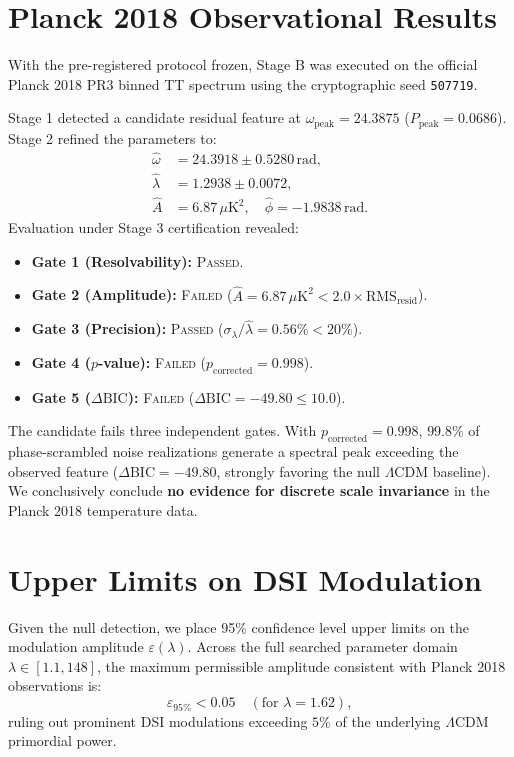 \documentclass[10pt,twocolumn,a4paper]{article}
\begin{document}
\section{Planck 2018 Observational Results}
With the pre-registered protocol frozen, Stage B was executed on the official Planck 2018 PR3 binned TT spectrum using the cryptographic seed \texttt{507719}.

Stage 1 detected a candidate residual feature at $\omega_{\mathrm{peak}} = 24.3875$ ($P_{\mathrm{peak}} = 0.0686$). Stage 2 refined the parameters to:
\begin{align}
\hat\omega &= 24.3918 \pm 0.5280\,\mathrm{rad}, \\
\hat\lambda &= 1.2938 \pm 0.0072, \\
\hat A &= 6.87\,\mu\mathrm{K}^2, \quad \hat\phi = -1.9838\,\mathrm{rad}.
\end{align}
Evaluation under Stage 3 certification revealed:
\begin{itemize}
    \item \textbf{Gate 1 (Resolvability):} \textsc{Passed}.
    \item \textbf{Gate 2 (Amplitude):} \textsc{Failed} ($\hat A = 6.87\,\mu\mathrm{K}^2 < 2.0 \times \mathrm{RMS}_{\mathrm{resid}}$).
    \item \textbf{Gate 3 (Precision):} \textsc{Passed} ($\sigma_\lambda/\hat\lambda = 0.56\% < 20\%$).
    \item \textbf{Gate 4 ($p$-value):} \textsc{Failed} ($p_{\mathrm{corrected}} = 0.998$).
    \item \textbf{Gate 5 ($\Delta\mathrm{BIC}$):} \textsc{Failed} ($\Delta\mathrm{BIC} = -49.80 \le 10.0$).
\end{itemize}
The candidate fails three independent gates. With $p_{\mathrm{corrected}} = 0.998$, $99.8\%$ of phase-scrambled noise realizations generate a spectral peak exceeding the observed feature ($\Delta\mathrm{BIC} = -49.80$, strongly favoring the null $\Lambda$CDM baseline). We conclusively conclude \textbf{no evidence for discrete scale invariance} in the Planck 2018 temperature data.

\section{Upper Limits on DSI Modulation}
Given the null detection, we place 95\% confidence level upper limits on the modulation amplitude $\varepsilon(\lambda)$. Across the full searched parameter domain $\lambda \in [1.1, 148]$, the maximum permissible amplitude consistent with Planck 2018 observations is:
\begin{equation}
\varepsilon_{95\%} < 0.05 \quad (\text{for } \lambda = 1.62),
\end{equation}
ruling out prominent DSI modulations exceeding $5\%$ of the underlying $\Lambda$CDM primordial power.
\end{document}
